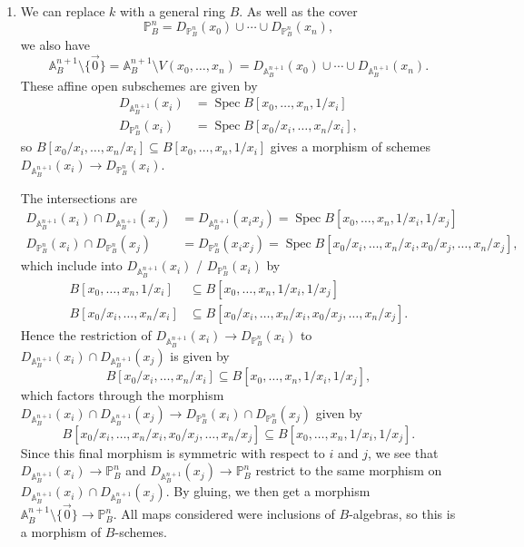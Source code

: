 \documentclass{report}
\newcommand{\A}{\mathbb{A}}
\renewcommand{\P}{\mathbb{P}} %
\DeclareMathOperator{\Spec}{Spec}
\begin{document}
\begin{enumerate}[label=\textbf{6.3.\Alph*.}]
	\item We can replace $k$ with a general ring $B$. As well as the cover
	      \begin{equation*}
		      \P^n_B = D_{\P^n_B}(x_0)\cup\cdots\cup D_{\P^n_B}(x_n),
	      \end{equation*}
	      we also have
	      \begin{equation*}
		      \A^{n+1}_B\setminus\{\vec0\}
		      = \A^{n+1}_B\setminus V(x_0,\ldots,x_n)
		      = D_{\A^{n+1}_B}(x_0)\cup\cdots\cup D_{\A^{n+1}_B}(x_n).
	      \end{equation*}
	      These affine open subschemes are given by
	      \begin{align*}
		      D_{\A^{n+1}_B}(x_i) & = \Spec B[x_0,\ldots,x_n,1/x_i]    \\
		      D_{\P^n_B}(x_i)     & = \Spec B[x_0/x_i,\ldots,x_n/x_i],
	      \end{align*}
	      so $B[x_0/x_i,\ldots,x_n/x_i]\subseteq B[x_0,\ldots,x_n,1/x_i]$ gives a
	      morphism of schemes $D_{\A^{n+1}_B}(x_i)\to D_{\P^n_B}(x_i)$.

	      The intersections are
	      \begin{align*}
		      D_{\A^{n+1}_B}(x_i)\cap D_{\A^{n+1}_B}(x_j)
		       & = D_{\A^{n+1}_B}(x_ix_j)
		      = \Spec B[x_0,\ldots,x_n,1/x_i,1/x_j] \\
		      D_{\P^n_B}(x_i)\cap D_{\P^n_B}(x_j)
		       & = D_{\P^n_B}(x_ix_j)
		      = \Spec B[x_0/x_i,\ldots,x_n/x_i,x_0/x_j,\ldots,x_n/x_j],
	      \end{align*}
	      which include into $D_{\A^{n+1}_B}(x_i)$ / $D_{\P^n_B}(x_i)$ by
	      \begin{align*}
		      B[x_0,\ldots,x_n,1/x_i]   & \subseteq
		      B[x_0,\ldots,x_n,1/x_i,1/x_j]         \\
		      B[x_0/x_i,\ldots,x_n/x_i] & \subseteq
		      B[x_0/x_i,\ldots,x_n/x_i,x_0/x_j,\ldots,x_n/x_j].
	      \end{align*}
	      Hence the restriction of $D_{\A^{n+1}_B}(x_i)\to D_{\P^n_B}(x_i)$ to
	      $D_{\A^{n+1}_B}(x_i)\cap D_{\A^{n+1}_B}(x_j)$ is given by
	      \begin{equation*}
		      B[x_0/x_i,\ldots,x_n/x_i] \subseteq B[x_0,\ldots,x_n,1/x_i,1/x_j],
	      \end{equation*}
	      which factors through the morphism
	      $D_{\A^{n+1}_B}(x_i)\cap D_{\A^{n+1}_B}(x_j)\to D_{\P^n_B}(x_i)\cap D_{\P^n_B}(x_j)$
	      given by
	      \begin{equation*}
		      B[x_0/x_i,\ldots,x_n/x_i,x_0/x_j,\ldots,x_n/x_j]
		      \subseteq B[x_0,\ldots,x_n,1/x_i,1/x_j].
	      \end{equation*}
	      Since this final morphism is symmetric with respect to $i$ and $j$, we
	      see that $D_{\A^{n+1}_B}(x_i)\to \P^n_B$ and
	      $D_{\A^{n+1}_B}(x_j)\to \P^n_B$ restrict to the same morphism on
	      $D_{\A^{n+1}_B}(x_i)\cap D_{\A^{n+1}_B}(x_j)$. By gluing, we then get a
	      morphism $\A^{n+1}_B\setminus\{\vec0\}\to\P^n_B$. All maps considered
	      were inclusions of $B$-algebras, so this is a morphism of $B$-schemes.


\end{enumerate}
\end{document}
